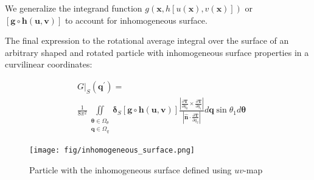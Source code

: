 \documentclass[10pt, a4paper]{article}
\begin{document}
\begin{multicols}{2}
We generalize the integrand function $g(\bm{x}, h[u(\bm{x}), v(\bm{x})])$ or $[\bm{g} \circ \bm{h}(\bm{u}, \bm{v})]$  to account for inhomogeneous surface.

The final expression to the rotational average integral over the surface of an arbitrary shaped and rotated particle with inhomogeneous surface properties in a curvilinear coordinates:

\begin{equation}\label{eq:general_int_S_inhomogenous}
    \begin{aligned}
    &\left.G\right|_S (\bm{q}^{\prime}) = \\ & \frac{1}{8\pi^2} \iint 
    \limits_{\substack{
        \bm{\theta} \in \Omega_{\theta} \\
        \bm{q} \in \Omega_{q}}}
    \bm{\delta}_S \left[\bm{g} \circ \bm{h}(\bm{u}, \bm{v})\right]
    \frac{\left|\frac{\partial \bm{T}}{\partial q_0} \times \frac{\partial \bm{T}}{\partial q_1} \right|}{\left|\hat{\bm{n}} \cdot \frac{\partial\bm{T}}{\partial q_2}\right|}
    d\bm{q}  \sin \theta_1 d \bm{\theta}
    \end{aligned}
\end{equation}

\begin{figure}[H]
    \centering
    \texttt{[image: fig/inhomogeneous\_surface.png]}
    \caption{
        Particle with the inhomogeneous surface defined using $uv$-map
    }
    \label{fig:inhomogeneous_surface}
\end{figure}
    
\end{multicols}


\end{document}
